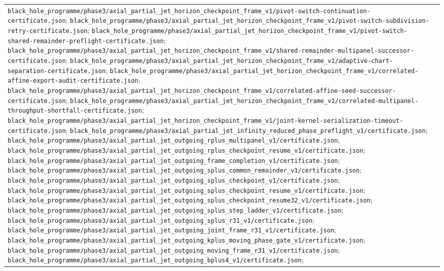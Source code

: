 \documentclass[11pt]{article}
\theoremstyle{definition}
\theoremstyle{remark}
\newcommand{\cert}[1]{\nolinkurl{#1}}
\begin{document}
{\begin{longtable}{@{}p{}p{}@{}}
\cert{black_hole_programme/phase3/axial_partial_jet_horizon_checkpoint_frame_v1/pivot-switch-continuation-certificate.json};
\cert{black_hole_programme/phase3/axial_partial_jet_horizon_checkpoint_frame_v1/pivot-switch-subdivision-retry-certificate.json};
\cert{black_hole_programme/phase3/axial_partial_jet_horizon_checkpoint_frame_v1/pivot-switch-shared-remainder-preflight-certificate.json};
\cert{black_hole_programme/phase3/axial_partial_jet_horizon_checkpoint_frame_v1/shared-remainder-multipanel-successor-certificate.json};
\cert{black_hole_programme/phase3/axial_partial_jet_horizon_checkpoint_frame_v1/adaptive-chart-separation-certificate.json};
\cert{black_hole_programme/phase3/axial_partial_jet_horizon_checkpoint_frame_v1/correlated-affine-export-audit-certificate.json};
\cert{black_hole_programme/phase3/axial_partial_jet_horizon_checkpoint_frame_v1/correlated-affine-seed-successor-certificate.json};
\cert{black_hole_programme/phase3/axial_partial_jet_horizon_checkpoint_frame_v1/correlated-multipanel-throughput-shortfall-certificate.json};
\cert{black_hole_programme/phase3/axial_partial_jet_horizon_checkpoint_frame_v1/joint-kernel-serialization-timeout-certificate.json};
\cert{black_hole_programme/phase3/axial_partial_jet_infinity_reduced_phase_preflight_v1/certificate.json};
\cert{black_hole_programme/phase3/axial_partial_jet_outgoing_rplus_multipanel_v1/certificate.json};
\cert{black_hole_programme/phase3/axial_partial_jet_outgoing_rplus_checkpoint_resume_v1/certificate.json};
\cert{black_hole_programme/phase3/axial_partial_jet_outgoing_frame_completion_v1/certificate.json};
\cert{black_hole_programme/phase3/axial_partial_jet_outgoing_splus_common_remainder_v1/certificate.json};
\cert{black_hole_programme/phase3/axial_partial_jet_outgoing_splus_checkpoint_v1/certificate.json};
\cert{black_hole_programme/phase3/axial_partial_jet_outgoing_splus_checkpoint_resume_v1/certificate.json};
\cert{black_hole_programme/phase3/axial_partial_jet_outgoing_splus_checkpoint_resume32_v1/certificate.json};
\cert{black_hole_programme/phase3/axial_partial_jet_outgoing_splus_step_ladder_v1/certificate.json};
\cert{black_hole_programme/phase3/axial_partial_jet_outgoing_splus_r31_v1/certificate.json};
\cert{black_hole_programme/phase3/axial_partial_jet_outgoing_joint_frame_r31_v1/certificate.json};
\cert{black_hole_programme/phase3/axial_partial_jet_outgoing_kplus_moving_phase_gate_v1/certificate.json};
\cert{black_hole_programme/phase3/axial_partial_jet_outgoing_moving_frame_r31_v1/certificate.json};
\cert{black_hole_programme/phase3/axial_partial_jet_outgoing_bplus4_v1/certificate.json};

\end{longtable}}
\end{document}
